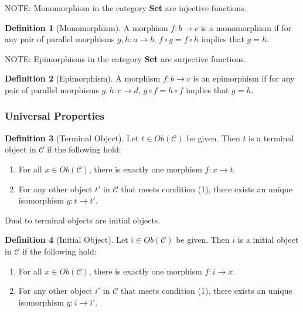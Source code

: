 \documentclass{article}
\theoremstyle{definition}
\newtheorem{definition}{Definition}
\begin{document}
NOTE: Monomorphism in the category \textbf{Set} are injective functions.
\begin{definition}[Monomorphism]
    A morphism $f:b\rightarrow c$ is a monomorphism if for any pair of parallel morphisms $g,h:a\rightarrow b$, $f\circ g=f\circ h$ implies that $g=h$.
\end{definition}

NOTE: Epimorphisms in the category \textbf{Set} are surjective functions.
\begin{definition}[Epimorphism]
    A morphism $f:b\rightarrow c$ is an epimorphism if for any pair of parallel morphisms $g,h:c\rightarrow d$, $g\circ f=h\circ f$ implies that $g=h$.
\end{definition}

\subsubsection*{Universal Properties}

\begin{definition}[Terminal Object]
    Let $t\in Ob(\mathcal{C})$ be given. Then $t$ is a terminal object in $\mathcal{C}$ if the following hold:
    \begin{enumerate}
        \item For all $x\in Ob(\mathcal{C})$, there is exactly one morphism $f:x\rightarrow t$.
        \item For any other object $t'$ in $\mathcal{C}$ that meets condition (1), there exists an unique isomorphism $g:t\rightarrow t'$.
    \end{enumerate}
\end{definition}

Dual to terminal objects are initial objects.
\begin{definition}[Initial Object]
    Let $i\in Ob(\mathcal{C})$ be given. Then $i$ is a initial object in $\mathcal{C}$ if the following hold:
    \begin{enumerate}
        \item For all $x\in Ob(\mathcal{C})$, there is exactly one morphism $f:i\rightarrow x$.
        \item For any other object $i'$ in $\mathcal{C}$ that meets condition (1), there exists an unique isomorphism $g:i\rightarrow i'$.
    \end{enumerate}
\end{definition}
\end{document}
